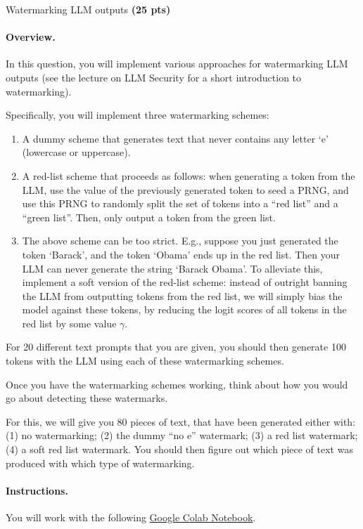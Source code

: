 \begin{question}{
Watermarking LLM outputs \textbf{(25 pts)}}

\paragraph{Overview.}
In this question, you will implement various approaches for watermarking LLM outputs (see the lecture on LLM Security for a short introduction to watermarking).

Specifically, you will implement three watermarking schemes:

\begin{enumerate}
    \item A dummy scheme that generates text that never contains any letter `e' (lowercase or uppercase).
    \item A red-list scheme that proceeds as follows: when generating a token from the LLM, use the value of the previously generated token to seed a PRNG, and use this PRNG to randomly split the set of tokens into a ``red list'' and a ``green list''. Then, only output a token from the green list.
    \item The above scheme can be too strict. E.g., suppose you just generated the token `Barack', and the token `Obama' ends up in the red list. Then your LLM can never generate the string `Barack Obama'. To alleviate this, implement a soft version of the red-list scheme: instead of outright banning the LLM from outputting tokens from the red list, we will simply bias the model against these tokens, by reducing the logit scores of all tokens in the red list by some value $\gamma$.
\end{enumerate}

For 20 different text prompts that you are given, you should then generate 100 tokens with the LLM using each of these watermarking schemes.

Once you have the watermarking schemes working, think about how you would go about detecting these watermarks.

For this, we will give you 80 pieces of text, that have been generated either with: (1) no watermarking; (2) the dummy ``no e'' watermark; (3) a red list watermark; (4) a soft red list watermark.
You should then figure out which piece of text was produced with which type of watermarking.

\paragraph{Instructions.}
You will work with the following
\href{https://colab.research.google.com/drive/1Bp6C05_6K8fFNiy1goxwtjg76rBcyQRn?usp=sharing}{Google Colab Notebook}.


\end{question}

